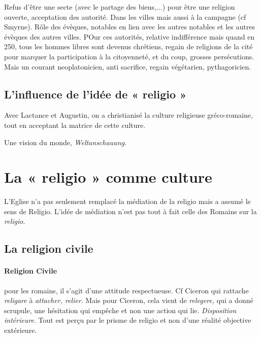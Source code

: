  \begin{Synthesis}
 Refus d'être une secte (avec le partage des biens,...) pour être une religion ouverte, acceptation des autorité. Dans les villes mais aussi à la campagne (cf Smyrne). Rôle des évèques, notables en lien avec les autres notables et les autres évèques des autres villes.
 POur ces autorités, relative indifférence mais quand en 250, tous les hommes libres sont devenus chrétiens, regain de religions de la cité pour marquer la participation à la citoyenneté, et du coup, grosses persécutions.
 Mais un courant neoplatonicien, anti sacrifice, regain végétarien, pythagoricien.
 \end{Synthesis}
 


\subsection{L’influence de l’idée de « religio »} \label{ChristologieCultureReligio}
 
 Avec Lactance et Augustin, on a christianisé la culture religieuse gréco-romaine, tout en acceptant la matrice de cette culture.

Une vision du monde, \emph{Weltanschauung}.




\section{La « religio » comme culture }

L'Eglise n'a pas seulement remplacé la médiation de la religio mais a assumé le sens de Religio. L'idée de médiation n'est pas tout à fait celle des Romains sur la \textit{religio}.




\subsection{La religion civile}
\paragraph{Religion Civile} pour les romains, il s'agit d'une attitude respectueuse. Cf Ciceron qui rattache \textit{religare} à \textit{attacher, relier}. Mais pour Ciceron, cela vient de \textit{relegere,} qui a donné scrupule, une hésitation qui empêche et non une action qui lie. \textit{Disposition intérieure}. Tout est perçu par le prisme de religio et non d'une réalité objective extérieure.

